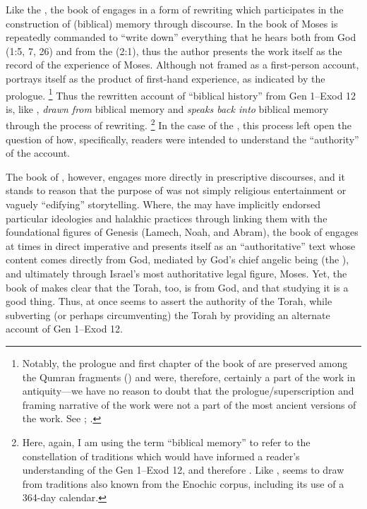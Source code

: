 
Like the \ga, the book of \jub engages in a form of rewriting which participates in the construction of (biblical) memory through \psgraphical discourse. In the book of \jub Moses is repeatedly commanded to ``write down'' everything that he hears both from God (1:5, 7, 26) and from the \ap (2:1), thus the author presents the work itself as the record of the experience of Moses. Although not framed as a first-person account, \jub portrays itself as the product of first-hand experience, as indicated by the prologue.%
    \footnote{Notably, the prologue and first chapter of the book of \jub are preserved among the Qumran fragments () and were, therefore, certainly a part of the work in antiquity---we have no reason to doubt that the prologue/superscription and framing narrative of the work were not a part of the most ancient versions of the work. See \cite[1:125]{vanderkam2018}; \cite[25]{vanderkam_metso-etal2010}.}
 Thus the rewritten account of ``biblical history'' from Gen 1--Exod 12 is, like \ga, \emph{drawn from} biblical memory and \emph{speaks back into} biblical memory through the process of rewriting.%
    \footnote{Here, again, I am using the term ``biblical memory'' to refer to the constellation of traditions which would have informed a reader's understanding of the Gen 1--Exod 12, and therefore \jub. Like \ga, \jub seems to draw from traditions also known from the Enochic corpus, including its use of a 364-day calendar.}
In the case of the \ga, this process left open the question of how, specifically, readers were intended to understand the ``authority'' of the account.

The book of \jub, however, engages more directly in prescriptive discourses, and it stands to reason that the purpose of \jub was not simply religious entertainment or vaguely ``edifying'' storytelling. Where, the \ga may have implicitly endorsed particular ideologies and halakhic practices through linking them with the foundational figures of Genesis (Lamech, Noah, and Abram), the book of \jub engages at times in direct imperative and presents itself as an ``authoritative'' text whose content comes directly from God, mediated by God's chief angelic being (the \ap), and ultimately through Israel's most authoritative legal figure, Moses. Yet, the book of \jub makes clear that the Torah, too, is from God, and that studying it is a good thing. Thus, \jub at once seems to assert the authority of the Torah, while subverting (or perhaps circumventing) the Torah by providing an alternate account of Gen 1--Exod 12. 

